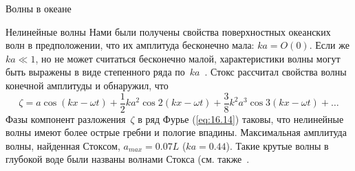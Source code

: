 \begin{chapter}{Волны в океане}
\begin{section}{Нелинейные волны}
Нами были получены свойства поверхностных океанских 
волн в предположении, что их амплитуда бесконечно мала: $ka = O(0)$. 
Если же $ka \ll 1$, но не может считаться бесконечно малой, характеристики
волны могут быть выражены в виде степенного ряда по~$ka$~\cite{Stokes:1847}. 
Стокс рассчитал свойства волны конечной амплитуды и обнаружил, что
\begin{equation}\label{eq:16.14}
 \zeta = a \cos(kx - \omega t) + \frac{1}{2} k a^{2}\cos 2(kx-\omega t) 
         + \frac{3}{8} k^{2} a^{3} \cos 3(k x - \omega t) + \ldots
\end{equation}
Фазы компонент разложения~$\zeta$ в ряд Фурье (\ref{eq:16.14}) таковы, 
что нелинейные волны имеют более острые гребни и пологие впадины.
Максимальная амплитуда волны, найденная Стоксом, $a_{max} = 0.07 L$ 
($ ka = 0.44$). Такие крутые волны в глубокой воде были названы волнами
Стокса (см. также~\cite[\S~250]{Lamb:1945}.
%


\end{section}
\end{chapter}
